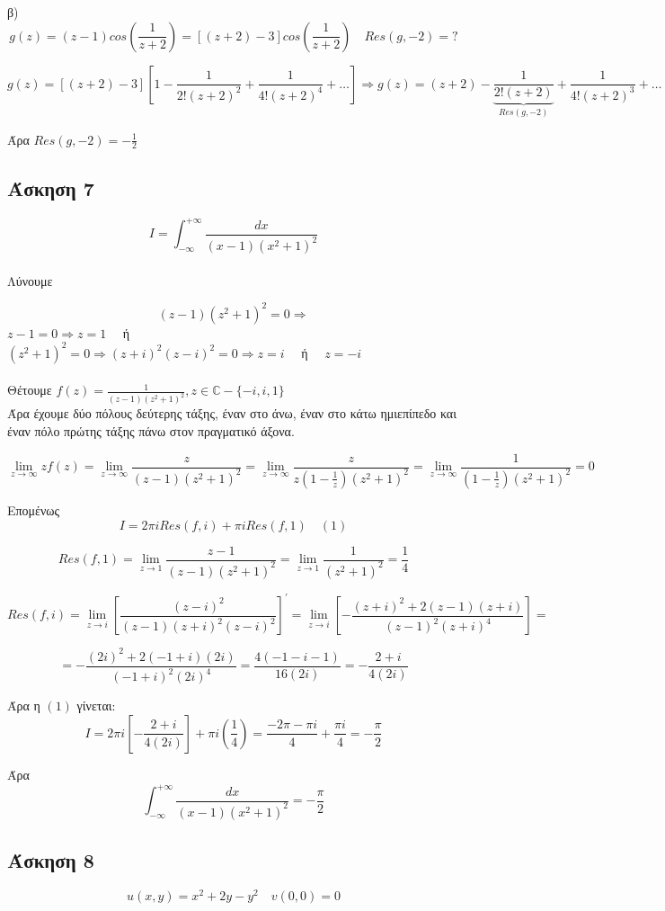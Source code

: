 \documentclass[12pt]{article}
\begin{document}
β)
$$g(z)=(z-1)cos\left({\frac{1}{z+2}}\right)
=[(z+2)-3]cos\left({\frac{1}{z+2}}\right)
\quad Res(g,-2)=?$$

$$
g(z)=[(z+2)-3]
\left[
1-\frac{1}{2!(z+2)^2}+\frac{1}{4!(z+2)^4}+\ldots
\right]
\Rightarrow
g(z)=(z+2)- \underbrace{\frac{1}{2!(z+2)}}_{\text{$Res(g,-2)$}}+\frac{1}{4!(z+2)^3}+\ldots
$$

Άρα $\boxed {Res(g,-2)=-\frac{1}{2}}$
\newpage
 \subsection{Άσκηση 7}
$$I= \int_{-\infty}^{+\infty} \frac{dx}{(x-1)(x^2+1)^2}$$
\\ Λύνουμε

$$ (z-1)(z^2+1)^2=0 \Rightarrow$$ 
$
z-1=0\Rightarrow z=1 \quad $ ή $ \quad$ 
\\
$ (z^2+1)^2=0\Rightarrow (z+i)^2(z-i)^2=0 \Rightarrow z=i \quad$ ή $ \quad z=-i$
\\
\\
Θέτουμε $ f(z)=\frac{1}{(z-1)(z^2+1)^2},z\in\mathbb{C}-\{-i,i,1\} $
\\
Άρα έχουμε δύο πόλους δεύτερης τάξης, έναν στο άνω, έναν στο κάτω ημιεπίπεδο και έναν πόλο πρώτης τάξης πάνω στον πραγματικό άξονα.

$$ \lim_{z \to \infty } zf(z)=\lim_{z \to \infty } \frac{z}{(z-1)(z^2+1)^2}=
\lim_{z \to \infty } \frac{z}{z\left(1-\frac{1}{z}\right)(z^2+1)^2}=
\lim_{z \to \infty } \frac{1}{\left(1-\frac{1}{z}\right)(z^2+1)^2}=0$$

Επομένως $$ Ι= 2 \pi i Res(f,i)+ \pi i Res(f,1)\quad (1) $$

$$  Res(f,1)=\lim_{z\to 1}\frac{z-1}{(z-1)(z^2+1)^2}=\lim_{z\to 1}\frac{1}{(z^2+1)^2}=\frac{1}{4}$$

$$ Res(f,i)=\lim_{z\to i} \left[ \frac{(z-i)^2}{(z-1)(z+i)^2(z-i)^2} \right]^{'}= \lim_{z\to i} \left[-\frac{(z+i)^2+2(z-1)(z+i)}{(z-1)^2(z+i)^4}\right]=$$

$$= -\frac{(2i)^2+2(-1+i)(2i)}{(-1+i)^2(2i)^4}= \frac{4(-1-i-1 )}{16(2i)}= -\frac{2+i}{4(2i)} $$

Άρα η $(1)$ γίνεται:
\\
$$ Ι=2\pi i \left[ -\frac{2+i}{4(2i)} \right] + \pi i \left( \frac{1}{4} \right) = \frac{ -2\pi -\pi i}{4} + \frac{ \pi i}{4}= -\frac{ \pi}{2}$$

Άρα $$ \int_{-\infty}^{+\infty} \frac{dx}{(x-1)(x^2+1)^2}=-\frac{ \pi}{2} $$
\newpage

 \subsection{Άσκηση 8}
$$u(x,y)=x^2+2y-y^2 \quad v(0,0)=0
$$
\end{document}
